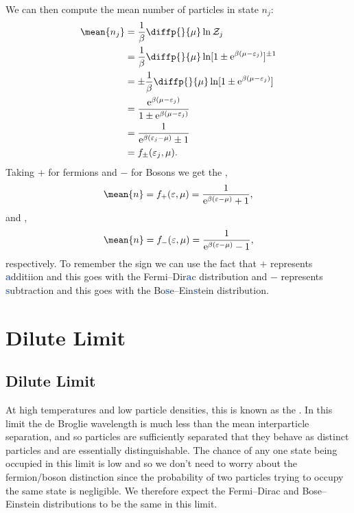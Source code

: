 \documentclass[fleqn]{NotesClass}
\newcommand*{\e}{\mathrm{e}}
\begin{document}
    We can then compute the mean number of particles in state \(n_j\):
    \begin{align}
        \mean{n_j} &= \frac{1}{\beta} \diffp{}{\mu} \ln \mathcal{Z}_j\\
        &= \frac{1}{\beta} \diffp{}{\mu} \ln [1 \pm \e^{\beta(\mu - \varepsilon_j)}]^{\pm 1}\\
        &= \pm \frac{1}{\beta} \diffp{}{\mu} \ln [1 \pm \e^{\beta(\mu - \varepsilon_j)}]\\
        &= \frac{\e^{\beta(\mu - \varepsilon_j)}}{1 \pm \e^{\beta(\mu - \varepsilon_j)}}\\
        &= \frac{1}{\e^{\beta(\varepsilon_j - \mu)} \pm 1}\\
        &= f_{\pm}(\varepsilon_j, \mu).
    \end{align}
    Taking \(+\) for fermions and \(-\) for Bosons we get the ,
    \begin{equation}
        \mean{n} = f_{+}(\varepsilon, \mu) = \frac{1}{\e^{\beta(\varepsilon - \mu)} + 1},
    \end{equation}
    and ,
    \begin{equation}
        \mean{n} = f_{-}(\varepsilon, \mu) = \frac{1}{\e^{\beta(\varepsilon - \mu)} - 1},
    \end{equation}
    respectively.
    To remember the sign we can use the fact that \(+\) represents \textbf{\textcolor{highlight}{a}}dditiion and this goes with the Fermi--Dir\textbf{\textcolor{highlight}{a}}c distribution and \(-\) represents \textbf{\textcolor{highlight}{s}}ubtraction and this goes with the Bo\textbf{\textcolor{highlight}{s}}e--Ein\textbf{\textcolor{highlight}{s}}tein distribution.
    
    \chapter{Dilute Limit}
    \section{Dilute Limit}
    At high temperatures and low particle densities, this is known as the .
    In this limit the de Broglie wavelength is much less than the mean interparticle separation, and so particles are sufficiently separated that they behave as distinct particles and are essentially distinguishable.
    The chance of any one state being occupied in this limit is low and so we don't need to worry about the fermion/boson distinction since the probability of two particles trying to occupy the same state is negligible.
    We therefore expect the Fermi--Dirac and Bose--Einstein distributions to be the same in this limit.
    
\end{document}
